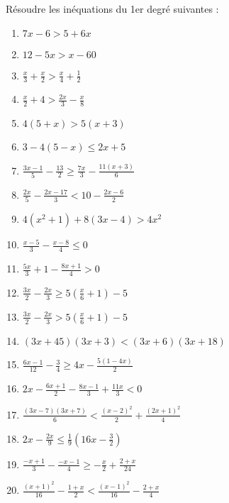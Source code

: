 \begin{exercice}
Résoudre les inéquations du 1er degré suivantes :
\begin{multicols}{2}
\begin{enumerate}
\item $7x-6>5+6x$
\item $12-5x>x-60$
\item $\frac{x}{3}+\frac{x}{2}>\frac{x}{4}+\frac{1}{2}$
\item $\frac{x}{2}+4>\frac{2x}{3}-\frac{x}{8}$
\item $4\left( 5+x \right)>5\left( x+3 \right)$
\item $3-4(5-x)\le 2x+5$
\item $\frac{3x-1}{5}-\frac{13}{2}\ge \frac{7x}{3}-\frac{11\left( x+3 \right)}{6}$
\item $\frac{2x}{5}-\frac{2x-17}{3}<10-\frac{2x-6}{2}$
\item $4({{x}^{2}}+1)+8(3x-4)>4{{x}^{2}}$
\item $\frac{x-5}{3}-\frac{x-8}{4}\le 0$
\item $\frac{5x}{3}+1-\frac{8x+1}{4}>0$
\item $\frac{3x}{2}-\frac{2x}{3}\ge 5\left( \frac{x}{6}+1 \right)-5$
\item $\frac{3x}{2}-\frac{2x}{3}>5\left( \frac{x}{6}+1 \right)-5$
\item $\left( 3x+45 \right)\left( 3x+3 \right)<\left( 3x+6 \right)\left( 3x+18 \right)$
\item $\frac{6x-1}{12}-\frac{3}{4}\ge 4x-\frac{5\left( 1-4x \right)}{2}$
\item $2x-\frac{6x+1}{2}-\frac{8x-1}{3}+\frac{11x}{3}<0$
\item $\frac{\left( 3x-7 \right)\left( 3x+7 \right)}{6}<\frac{{{\left( x-2 \right)}^{2}}}{2}+\frac{{{\left( 2x+1 \right)}^{2}}}{4}$
\item $2x-\frac{2x}{9}\le \frac{1}{9}\left( 16x-\frac{3}{2} \right)$
\item $\frac{-x+1}{3}-\frac{-x-1}{4}\ge -\frac{x}{2}+\frac{2+x}{24}$
\item $\frac{{{\left( x+1 \right)}^{2}}}{16}-\frac{1+x}{2}<\frac{{{\left( x-1 \right)}^{2}}}{16}-\frac{2+x}{4}$
\end{enumerate}
\end{multicols}
\end{exercice}

